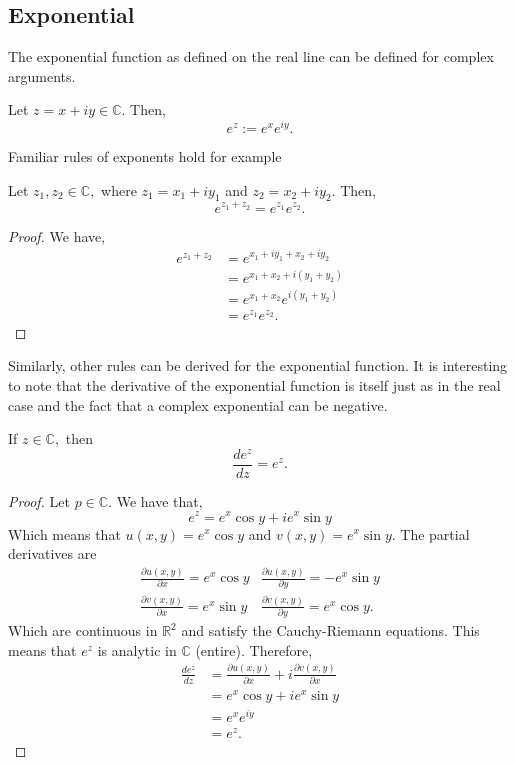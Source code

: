 \documentclass[12pt]{book}
\begin{document}
\subsection{Exponential}
The exponential function as defined on the real line can be defined for complex arguments. 
\begin{defn}
    Let $z = x + iy \in \mathbb{C}.$ Then,
    \[
        e^{z} := e^{x}e^{iy}.
    \]
\end{defn}
Familiar rules of exponents hold for example 
\begin{thm}
    Let $z_1, z_2 \in \mathbb{C},$ where $z_1 = x_1 + iy_1$ and $z_2 = x_2 + iy_2$. Then,
    \[
        e^{z_1 + z_2} = e^{z_1}e^{z_2}.
    \]
\end{thm}
\begin{proof}
    We have,
    \begin{align*}
        e^{z_1 + z_2}
            &=
                e^{x_1 + iy_1 + x_2 + iy_2}\\
            &=
                e^{x_1 + x_2 + i(y_1 + y_2)}\\
            &=
                e^{x_1 + x_2}e^{i(y_1 + y_2)}\\
            &=
                e^{z_1}e^{z_2}.
    \end{align*}
\end{proof}
Similarly, other rules can be derived for the exponential function. It is interesting to note that the derivative of the exponential function is itself just as in the real case and the fact that a complex exponential can be negative. 
\begin{thm}
    If $z \in \mathbb{C},$ then
    \[
        \frac{d e^{z}}{d z} = e^{z}.
    \]
\end{thm}
\begin{proof}
    Let $p \in \mathbb{C}.$ We have that,
    \[
        e^{z} = e^{x}\cos y + ie^{x}\sin y
    \]
    Which means that $u(x, y) = e^{x}\cos y$ and $v(x, y) = e^{x}\sin y$. The partial derivatives are
    \[
        \begin{array}{cc}
            \frac{\partial u(x, y)}{\partial x} = e^{x}\cos y & \frac{\partial u(x, y)}{\partial y} = -e^{x}\sin y \\
            \frac{\partial v(x, y)}{\partial x} = e^{x}\sin y & \frac{\partial v(x, y)}{\partial y} = e^{x}\cos y.
        \end{array}
    \]
    Which are continuous in $\mathbb{R}^{2}$ and satisfy the Cauchy-Riemann equations. This means that $e^{z}$ is analytic in $\mathbb{C}$ (entire). Therefore,
    \begin{align*}
        \frac{d e^{z}}{d z}
            &=
               \frac{\partial u(x, y)}{\partial x} + i \frac{\partial v(x, y)}{\partial x} \\
            &= 
                e^{x}\cos y + ie^{x} \sin y\\
            &=
                e^{x}e^{iy} \\
            &=
                e^{z}.
    \end{align*}
\end{proof}
\end{document}
